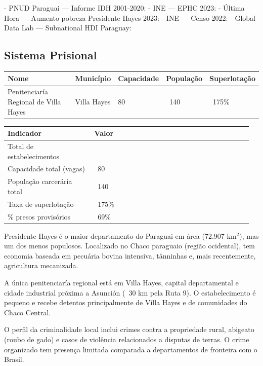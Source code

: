 - PNUD Paraguai --- Informe IDH 2001-2020: 
- INE --- EPHC 2023: 
- Última Hora --- Aumento pobreza Presidente Hayes 2023: 
- INE --- Censo 2022: 
- Global Data Lab --- Subnational HDI Paraguay: 


\subsection{Sistema Prisional}



{\small
\setlength{\tabcolsep}{3pt}
\renewcommand{\arraystretch}{1.12}
{\small
\begin{tabularx}{\linewidth}{lXXXX}
\toprule
Nome & Município & Capacidade & População & Superlotação \\
\midrule
Penitenciaría Regional de Villa Hayes & Villa Hayes & 80 & ~140 & ~175\% \\
\bottomrule
\end{tabularx}
}
}


{\small
\setlength{\tabcolsep}{3pt}
\renewcommand{\arraystretch}{1.12}
\begin{tabularx}{\linewidth}{>{\raggedright\arraybackslash}p{0.34\linewidth} >{\raggedright\arraybackslash}p{0.62\linewidth}}
\toprule
Indicador & Valor \\
\midrule
Total de estabelecimentos & 1 \\
Capacidade total (vagas) & ~80 \\
População carcerária total & ~140 \\
Taxa de superlotação & ~175\% \\
\% presos provisórios & ~69\% \\
\bottomrule
\end{tabularx}
}


Presidente Hayes é o maior departamento do Paraguai em área (72.907 km$^2$), mas um dos menos populosos. Localizado no Chaco paraguaio (região ocidental), tem economia baseada em pecuária bovina intensiva, tânninhas e, mais recentemente, agricultura mecanizada.

A única penitenciaría regional está em Villa Hayes, capital departamental e cidade industrial próxima a Asunción (~30 km pela Ruta 9). O estabelecimento é pequeno e recebe detentos principalmente de Villa Hayes e de comunidades do Chaco Central.

O perfil da criminalidade local inclui crimes contra a propriedade rural, abigeato (roubo de gado) e casos de violência relacionados a disputas de terras. O crime organizado tem presença limitada comparada a departamentos de fronteira com o Brasil.

